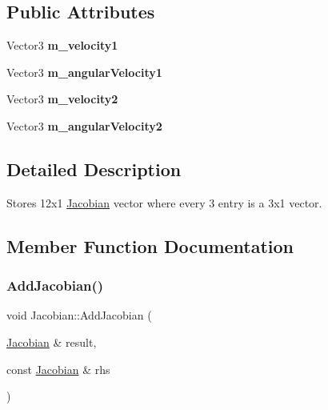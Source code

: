\subsection*{Public Attributes}
\begin{DoxyCompactItemize}
\item 
\mbox{\label{classJacobian_ae70c2cc3d277a1514e0d505cfbfbb24c}} 
Vector3 {\bfseries m\+\_\+velocity1}
\item 
\mbox{\label{classJacobian_ab7e86a53e4f0ef9c803dbad320ecc088}} 
Vector3 {\bfseries m\+\_\+angular\+Velocity1}
\item 
\mbox{\label{classJacobian_abeedd202dfcee5c1c50c6448f4ae3215}} 
Vector3 {\bfseries m\+\_\+velocity2}
\item 
\mbox{\label{classJacobian_ab822413ac0e6d13a574964472ef04016}} 
Vector3 {\bfseries m\+\_\+angular\+Velocity2}
\end{DoxyCompactItemize}


\subsection{Detailed Description}
Stores 12x1 \hyperlink{classJacobian}{Jacobian} vector where every 3 entry is a 3x1 vector. 

\subsection{Member Function Documentation}
\mbox{\label{classJacobian_a00f89f0575064ee6312bc18a282cf00d}} 
\subsubsection{\texorpdfstring{Add\+Jacobian()}{AddJacobian()}}
{\footnotesize\ttfamily void Jacobian\+::\+Add\+Jacobian (\begin{DoxyParamCaption}\item[{\hyperlink{classJacobian}{Jacobian} \&}]{result,  }\item[{const \hyperlink{classJacobian}{Jacobian} \&}]{rhs }\end{DoxyParamCaption})}



